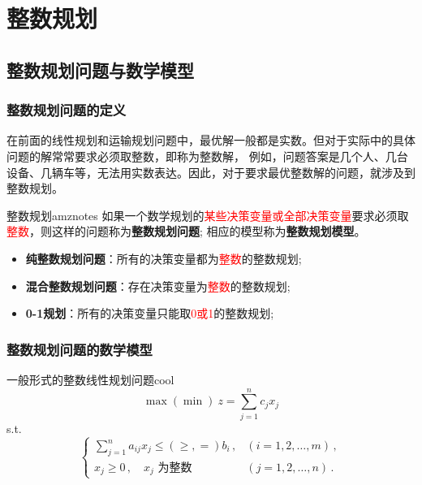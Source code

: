 \ifx\allfiles\undefined

	
	
\else
\fi
    \chapter{整数规划}
    \section{整数规划问题与数学模型}
    \subsection{整数规划问题的定义}
    在前面的线性规划和运输规划问题中，最优解一般都是实数。但对于实际中的具体问题的解常常要求必须取整数，即称为整数解，
例如，问题答案是几个人、几台设备、几辆车等，无法用实数表达。因此，对于要求最优整数解的问题，就涉及到整数规划。
\begin{dfnbox}{整数规划}{amznotes}
    如果一个数学规划的\textcolor{red}{某些决策变量或全部决策变量}要求必须取\textcolor{red}{整数}，则这样的问题称为\textbf{整数规划问题};
相应的模型称为\textbf{整数规划模型}。
\end{dfnbox}
\begin{itemize}
    \item \textbf{纯整数规划问题}：所有的决策变量都为\textcolor{red}{整数}的整数规划;
    \item \textbf{混合整数规划问题}：存在决策变量为\textcolor{red}{整数}的整数规划;
    \item \textbf{0-1规划}：所有的决策变量只能取\textcolor{red}{0或1}的整数规划;
\end{itemize}

\subsection{整数规划问题的数学模型}

\begin{thmbox}{一般形式的整数线性规划问题}{cool}
    \[
    \max(\min) \ z = \sum_{j=1}^{n} c_j x_j
    \]
    s.t.
    \[
    \begin{cases}
        \sum_{j=1}^{n} a_{ij} x_j \leq (\geq, =) b_i \,, & (i=1,2,\dots,m) \,, \\
        x_j \geq 0 \,, \quad x_j \text{ 为整数} & (j=1,2,\dots,n) \,.
    \end{cases}
    \]
\end{thmbox}

